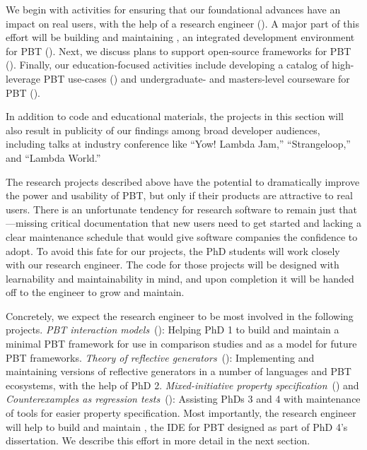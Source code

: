 We begin with activities for ensuring that our foundational
advances have an impact on real users, with the help of a research
engineer (). A major part of this
effort will be
building and maintaining \tyche, an integrated development environment for PBT
(). Next, we discuss plans to
support open-source frameworks for PBT ().
Finally, our
education-focused activities include developing a catalog of high-leverage PBT
use-cases () and undergraduate- and
masters-level courseware for PBT
().

In addition to code and educational materials, the projects in this section will
also result in publicity of our findings among broad developer audiences, including talks at
industry conference like ``Yow! Lambda Jam,'' ``Strangeloop,'' and
``Lambda World.''

%
The research projects described above have the potential to
dramatically improve the power and usability of PBT, but only
if their products are attractive to real users. There is an unfortunate tendency for
research software to remain just that---missing critical
documentation that new users need to get started and lacking a clear
maintenance schedule that would give software companies the confidence
to adopt.
To avoid this fate for our projects, the PhD students will work closely with our
research engineer. The code for those projects will be designed with learnability and
maintainability in mind, and upon
completion it will be handed off to the
engineer to grow and maintain.

Concretely, we expect the research engineer to be most involved in the following
projects. {\em PBT interaction models}~(): Helping PhD
  1 to build and maintain a minimal PBT framework for use in comparison studies
  and as a model for future PBT frameworks.
  {\em Theory of reflective generators}~():
  Implementing and maintaining versions of reflective generators in a number of
  languages and PBT ecosystems, with the help of PhD 2.
  {\em Mixed-initiative property
  specification}~() and {\em Counterexamples as
  regression tests}~():
  Assisting PhDs
  3 and 4 with maintenance of tools for easier property specification.
%
Most importantly, the research engineer will help to build and maintain
\tyche{}, the IDE for PBT designed as part of PhD 4's dissertation. We
describe this effort in more detail in the next section.


